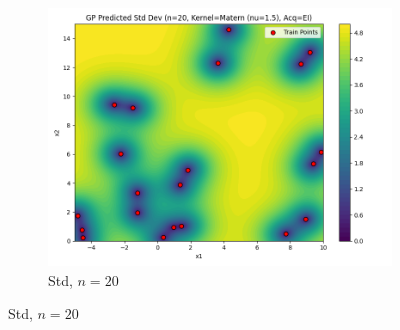 \documentclass[a4paper,12pt]{article}
\begin{document}
\begin{figure}[H]
\begin{subfigure}{0.3\textwidth}
    \includegraphics[width=\linewidth]{Task-02/images/gp_std_matern_n20_EI.png}
    \caption{Std, $n=20$}
\end{subfigure}


\end{figure}
\end{document}
